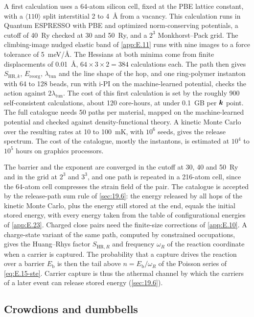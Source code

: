 A first calculation uses a 64-atom silicon cell, fixed at the PBE lattice constant, with a $\langle110\rangle$ split interstitial 2 to \SI{4}{\angstrom} from a vacancy. This calculation runs in Quantum ESPRESSO with PBE and optimized norm-conserving potentials, a cutoff of \SI{40}{Ry} checked at 30 and \SI{50}{Ry}, and a $2^3$ Monkhorst--Pack grid. The climbing-image nudged elastic band of \cref{app:E.11} runs with nine images to a force tolerance of \SI{5}{meV/\angstrom}. The Hessians at both minima come from finite displacements of \SI{0.01}{\angstrom}, $64\times3\times2 = 384$ calculations each. The path then gives $S_{\mathrm{HR},k}$, $E_{\mathrm{reorg}}$, $\lambda_{\mathrm{tun}}$ and the line shape of the hop, and one ring-polymer instanton with 64 to 128 beads, run with i-PI on the machine-learned potential, checks the action against $2\lambda_{\mathrm{tun}}$. The cost of this first calculation is set by the roughly 900 self-consistent calculations, about 120 core-hours, at under \SI{0.1}{GB} per $\bm{k}$ point. The full catalogue needs 50 paths per material, mapped on the machine-learned potential and checked against density-functional theory. A kinetic Monte Carlo over the resulting rates at 10 to \SI{100}{mK}, with $10^6$ seeds, gives the release spectrum. The cost of the catalogue, mostly the instantons, is estimated at $10^4$ to $10^5$ hours on graphics processors.

The barrier and the exponent are converged in the cutoff at 30, 40 and \SI{50}{Ry} and in the grid at $2^3$ and $3^3$, and one path is repeated in a 216-atom cell, since the 64-atom cell compresses the strain field of the pair. The catalogue is accepted by the release-path sum rule of \cref{sec:19.6}: the energy released by all hops of the kinetic Monte Carlo, plus the energy still stored at the end, equals the initial stored energy, with every energy taken from the table of configurational energies of \cref{app:E.23}. Charged close pairs need the finite-size corrections of \cref{app:E.10}. A charge-state variant of the same path, computed by constrained occupations, gives the Huang--Rhys factor $S_{\mathrm{HR},R}$ and frequency $\omega_R$ of the reaction coordinate when a carrier is captured. The probability that a capture drives the reaction over a barrier $E_{\mathrm{b}}$ is then the tail above $n = E_{\mathrm{b}}/\omega_R$ of the Poisson series of \cref{eq:E.15-ste}. Carrier capture is thus the athermal channel by which the carriers of a later event can release stored energy (\cref{sec:19.6}).

\subsection{Crowdions and dumbbells}

